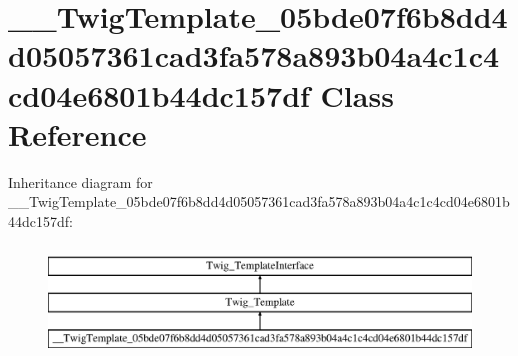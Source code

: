 \hypertarget{class_____twig_template__05bde07f6b8dd4d05057361cad3fa578a893b04a4c1c4cd04e6801b44dc157df}{}\section{\+\_\+\+\_\+\+Twig\+Template\+\_\+05bde07f6b8dd4d05057361cad3fa578a893b04a4c1c4cd04e6801b44dc157df Class Reference}
\label{class_____twig_template__05bde07f6b8dd4d05057361cad3fa578a893b04a4c1c4cd04e6801b44dc157df}
Inheritance diagram for \+\_\+\+\_\+\+Twig\+Template\+\_\+05bde07f6b8dd4d05057361cad3fa578a893b04a4c1c4cd04e6801b44dc157df\+:\begin{figure}[H]
\begin{center}
\leavevmode
\includegraphics[height=3.000000cm]{class_____twig_template__05bde07f6b8dd4d05057361cad3fa578a893b04a4c1c4cd04e6801b44dc157df}
\end{center}
\end{figure}
